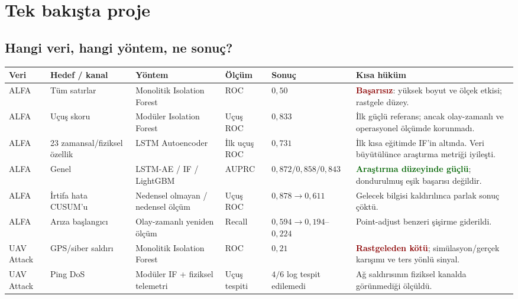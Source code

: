 \documentclass[10pt,a4paper]{article}
\newcommand{\good}[1]{\textcolor{darkgreen}{\textbf{#1}}}
\newcommand{\bad}[1]{\textcolor{darkred}{\textbf{#1}}}
\begin{document}
\tableofcontents
\newpage

\section{Tek bakışta proje}

\subsection{Hangi veri, hangi yöntem, ne sonuç?}

\begin{landscape}
\scriptsize
\begin{longtable}{p{2.2cm}p{3.0cm}p{3.5cm}p{3.0cm}p{3.0cm}p{4.3cm}}
\toprule
\textbf{Veri} & \textbf{Hedef / kanal} & \textbf{Yöntem} & \textbf{Ölçüm} &
\textbf{Sonuç} & \textbf{Kısa hüküm} \\
\midrule
\endhead

ALFA & Tüm satırlar & Monolitik Isolation Forest & ROC & $0{,}50$ &
\bad{Başarısız}: yüksek boyut ve ölçek etkisi; rastgele düzey. \\

ALFA & Uçuş skoru & Modüler Isolation Forest & Uçuş ROC & $0{,}833$ &
İlk güçlü referans; ancak olay-zamanlı ve operasyonel ölçümde korunmadı. \\

ALFA & 23 zamansal/fiziksel özellik & LSTM Autoencoder & İlk uçuş ROC & $0{,}731$ &
İlk kısa eğitimde IF'in altında. Veri büyütülünce araştırma metriği iyileşti. \\

ALFA & Genel & LSTM-AE / IF / LightGBM & AUPRC &
$0{,}872 / 0{,}858 / 0{,}843$ &
\good{Araştırma düzeyinde güçlü}; dondurulmuş eşik başarısı değildir. \\

ALFA & İrtifa hata CUSUM'u & Nedensel olmayan / nedensel ölçüm & Uçuş ROC &
$0{,}878 \rightarrow 0{,}611$ & Gelecek bilgisi kaldırılınca parlak sonuç çöktü. \\

ALFA & Arıza başlangıcı & Olay-zamanlı yeniden ölçüm & Recall &
$0{,}594 \rightarrow 0{,}194$--$0{,}224$ & Point-adjust benzeri şişirme giderildi. \\

UAV Attack & GPS/siber saldırı & Monolitik Isolation Forest & ROC & $0{,}21$ &
\bad{Rastgeleden kötü}; simülasyon/gerçek karışımı ve ters yönlü sinyal. \\

UAV Attack & Ping DoS & Modüler IF + fiziksel telemetri & Uçuş tespiti &
$4/6$ log tespit edilemedi & Ağ saldırısının fiziksel kanalda görünmediği ölçüldü. \\


\end{longtable}
\end{landscape}
\end{document}
